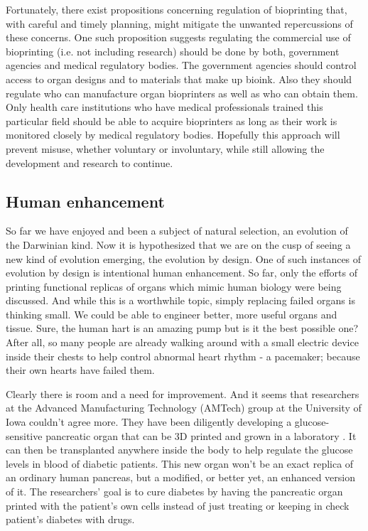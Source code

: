 \documentclass[12pt]{article} %
\begin{document}
Fortunately, there exist propositions concerning regulation of bioprinting that, with careful and timely planning, might mitigate the unwanted repercussions of these concerns. One such proposition suggests regulating the commercial use of bioprinting (i.e. not including research) should be done by both, government agencies and medical regulatory bodies. The government agencies should control access to organ designs and to materials that make up bioink. Also they should regulate who can manufacture organ bioprinters as well as who can obtain them. Only health care institutions who have medical professionals trained this particular field should be able to acquire bioprinters as long as their work is monitored closely by medical regulatory bodies. Hopefully this approach will prevent misuse, whether voluntary or involuntary, while still allowing the development and research to continue.


\subsection{Human enhancement} %

So far we have enjoyed and been a subject of natural selection, an evolution of the Darwinian kind. Now it is hypothesized that we are on the cusp of seeing a new kind of evolution emerging, the evolution by design. One of such instances of evolution by design is intentional human enhancement. So far, only the efforts of printing functional replicas of organs which mimic human biology were being discussed. And while this is a worthwhile topic, simply replacing failed organs is thinking small. We could be able to engineer better, more useful organs and tissue. Sure, the human hart is an amazing pump but is it the best possible one?  After all, so many people \cite{Wood:2002} are already walking around with a small electric device inside their chests to help control abnormal heart rhythm - a pacemaker; because their own hearts have failed them.

Clearly there is room and a need for improvement. And it seems that researchers at the Advanced Manufacturing Technology (AMTech) group at the University of Iowa couldn't agree more. They have been diligently developing a glucose-sensitive pancreatic organ that can be 3D printed and grown in a laboratory \cite{Ozbolat:2013}. It can then be transplanted anywhere inside the body to help regulate the glucose levels in blood of diabetic patients. This new organ won't be an exact replica of an ordinary human pancreas, but a modified, or better yet, an enhanced version of it. The researchers' goal is to cure diabetes by having the pancreatic organ printed with the patient's own cells instead of just treating or keeping in check patient's diabetes with drugs.
\end{document}
